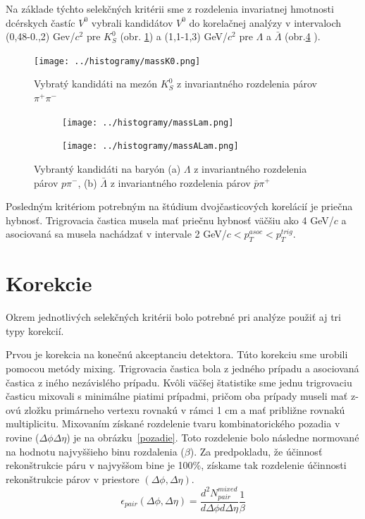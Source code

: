 \documentclass[thesismargins, thesislinespacing]{rnthesis}
\begin{document}
Na základe týchto selekčných kritérii sme z rozdelenia invariatnej hmotnosti dcérskych častíc $V^0$ vybrali kandidátov $V^{0}$ do korelačnej analýzy v intervaloch (0,48-0.,2) Gev/$c^{2}$ pre $K^{0}_{S}$ (obr. \ref{k0}) a (1,1-1,3) GeV/$c^{2}$ pre $\Lambda$ a $\bar{\Lambda}$ (obr.\ref{Lambdy} ). 

\begin{figure}[hbtp!]
	\centering
	\texttt{[image: ../histogramy/massK0.png]}
	\caption{Vybratý kandidáti na mezón $K^0_S$ z invariantného rozdelenia párov $\pi^+\pi^-$}
	\label{k0}
\end{figure}
\begin{figure}
	\centering
	\begin{subfigure}{0.5\textwidth}
		\centering
		\texttt{[image: ../histogramy/massLam.png]}
		\caption{}
		\label{Lam}
	\end{subfigure}%
	\begin{subfigure}{0.5\textwidth}
		\centering
		\texttt{[image: ../histogramy/massALam.png]}
		\caption{}
		\label{ALam}
	\end{subfigure}
	\caption{Vybrantý kandidáti na baryón (a) $\Lambda$ z invariantného rozdelenia párov $p\pi^-$, (b) $\bar{\Lambda}$ z invariantného rozdelenia párov $\bar{p}\pi^+$}
	\label{Lambdy}
\end{figure}

Posledným kritériom potrebným na štúdium dvojčasticových korelácií je priečna hybnosť. Trigrovacia častica musela mať priečnu hybnosť väčšiu ako 4 GeV/$c$ a asociovaná sa musela nachádzať v intervale 2 GeV/$c<p_T^{asoc}<p_T^{trig}$.

\section{Korekcie}
Okrem jednotlivých selekčných kritérii bolo potrebné pri analýze použiť aj tri typy korekcií. 

Prvou je korekcia na konečnú akceptanciu detektora. Túto korekciu sme urobili pomocou metódy mixing. Trigrovacia častica bola z jedného prípadu a asociovaná častica z iného nezávislého prípadu. Kvôli väčšej štatistike sme jednu trigrovaciu časticu mixovali s minimálne piatimi prípadmi, pričom oba prípady museli mať z-ovú zložku primárneho vertexu rovnakú v rámci 1 cm a mať približne rovnakú multiplicitu. Mixovaním získané rozdelenie tvaru kombinatorického pozadia v rovine ($\Delta \phi \Delta \eta$) je na obrázku~\ref{pozadie}. Toto rozdelenie bolo následne normované na hodnotu najvyššieho binu rozdalenia ($\beta$). Za predpokladu, že účinnosť rekonštrukcie páru v najvyššom bine je 100\%, získame tak rozdelenie účinnosti rekonštrukcie párov v priestore $(\Delta \phi,\Delta\eta)$.
\begin{equation}
\epsilon_{pair}(\Delta\phi,\Delta\eta) = \frac{d^2N^{mixed}_{pair}}{d\Delta\phi d\Delta\eta}\frac{1}{\beta}
\end{equation}
\end{document}
